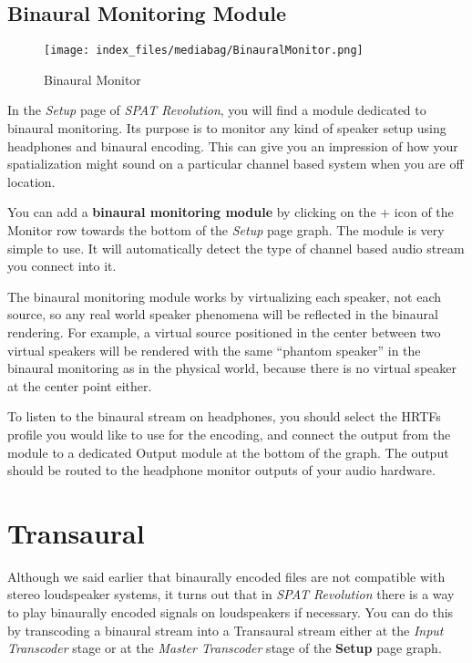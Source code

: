 \documentclass[
  letterpaper,
  DIV=11,
  numbers=noendperiod]{scrreport}
\begin{document}
\hypertarget{binaural-monitoring-module}{%
\section{Binaural Monitoring Module}\label{binaural-monitoring-module}}

\begin{figure}

{\centering \texttt{[image: index\_files/mediabag/BinauralMonitor.png]}

}

\caption{Binaural Monitor}

\end{figure}

In the \emph{Setup} page of \emph{SPAT Revolution}, you will find a
module dedicated to binaural monitoring. Its purpose is to monitor any
kind of speaker setup using headphones and binaural encoding. This can
give you an impression of how your spatialization might sound on a
particular channel based system when you are off location.

You can add a \textbf{binaural monitoring module} by clicking on the +
icon of the Monitor row towards the bottom of the \emph{Setup} page
graph. The module is very simple to use. It will automatically detect
the type of channel based audio stream you connect into it.

The binaural monitoring module works by virtualizing each speaker, not
each source, so any real world speaker phenomena will be reflected in
the binaural rendering. For example, a virtual source positioned in the
center between two virtual speakers will be rendered with the same
``phantom speaker'' in the binaural monitoring as in the physical world,
because there is no virtual speaker at the center point either.

To listen to the binaural stream on headphones, you should select the
HRTFs profile you would like to use for the encoding, and connect the
output from the module to a dedicated Output module at the bottom of the
graph. The output should be routed to the headphone monitor outputs of
your audio hardware.

\hypertarget{transaural}{%
\chapter{Transaural}\label{transaural}}

Although we said earlier that binaurally encoded files are not
compatible with stereo loudspeaker systems, it turns out that in
\emph{SPAT Revolution} there is a way to play binaurally encoded signals
on loudspeakers if necessary. You can do this by transcoding a binaural
stream into a Transaural stream either at the \emph{Input Transcoder}
stage or at the \emph{Master Transcoder} stage of the \textbf{Setup}
page graph.
\end{document}
